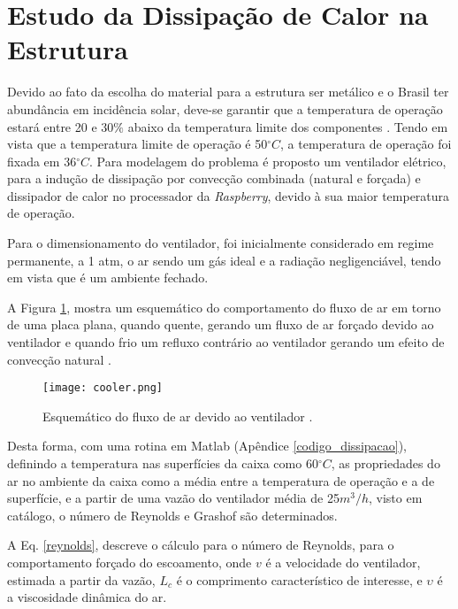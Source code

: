 
\section{Estudo da Dissipação de Calor na Estrutura}

Devido ao fato da escolha do material para a estrutura ser metálico e o Brasil ter abundância em incidência solar, deve-se garantir que a temperatura de operação estará entre 20 e $30\%$ abaixo da temperatura limite dos componentes \cite{temperatura}. Tendo em vista que a temperatura limite de operação é 50$^{\circ}C$, a temperatura de operação foi fixada em 36$^{\circ}C$. Para modelagem do problema é proposto um ventilador elétrico, para a indução de dissipação por convecção combinada (natural e forçada) e dissipador de calor no processador da \textit{Raspberry}, devido à sua maior temperatura de operação.

Para o dimensionamento do ventilador, foi inicialmente considerado em regime permanente, a 1 atm, o ar sendo um gás ideal e a radiação negligenciável, tendo em vista que é um ambiente fechado.

A Figura \ref{cooler}, mostra um esquemático do comportamento do fluxo de ar em torno de uma placa plana, quando quente, gerando um fluxo de ar forçado devido ao ventilador e quando frio um refluxo contrário ao ventilador gerando um efeito de convecção natural \cite{livro_transcal}.

\begin{figure}[h]
	\centering
    \texttt{[image: cooler.png]}
    \caption{Esquemático do fluxo de ar devido ao ventilador \cite{livro_transcal}.}
    \label{cooler}
\end{figure}

Desta forma, com uma rotina em Matlab (Apêndice \ref{codigo_dissipacao}), definindo a temperatura nas superfícies da caixa como 60$^{\circ}C$, as propriedades do ar no ambiente da caixa como a média entre a temperatura de operação e a de superfície, e a partir de uma vazão do ventilador média de 25$m^3/h$, visto em catálogo, o número de Reynolds e Grashof são determinados. 

A Eq. \ref{reynolds}, descreve o cálculo para o número de Reynolds, para o comportamento forçado do escoamento, onde $v$ é a velocidade do ventilador, estimada a partir da vazão, $L_c$ é o comprimento característico de interesse, e $\upsilon$ é a viscosidade dinâmica do ar.

